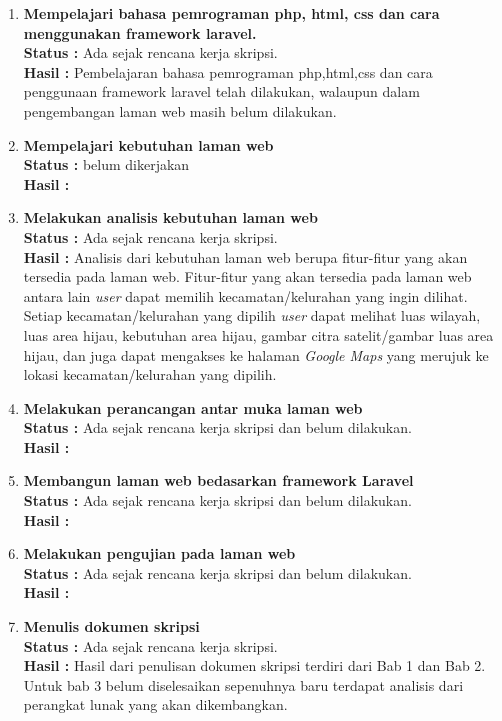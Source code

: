 \documentclass[a4paper,twoside]{article}
\begin{document}
\begin{enumerate}
		\item \textbf{Mempelajari bahasa pemrograman php, html, css dan cara menggunakan framework laravel.}\\
		{\bf Status :} Ada sejak rencana kerja skripsi.\\
		{\bf Hasil :} Pembelajaran bahasa pemrograman php,html,css dan cara penggunaan framework laravel telah dilakukan, walaupun dalam pengembangan laman web masih belum dilakukan.

		\item \textbf{ Mempelajari kebutuhan laman web}\\
		{\bf Status :} belum dikerjakan \\
		{\bf Hasil :} 

		\item \textbf{Melakukan analisis kebutuhan laman web} \\
		{\bf Status :} Ada sejak rencana kerja skripsi.\\
		{\bf Hasil :} Analisis dari kebutuhan laman web berupa fitur-fitur yang akan tersedia pada laman web. Fitur-fitur yang akan tersedia pada laman web antara lain \textit{user} dapat memilih kecamatan/kelurahan yang ingin dilihat. Setiap kecamatan/kelurahan yang dipilih \textit{user} dapat melihat luas wilayah, luas area hijau, kebutuhan area hijau, gambar citra satelit/gambar luas area hijau, dan juga dapat mengakses ke halaman \textit{Google Maps} yang merujuk ke lokasi kecamatan/kelurahan yang dipilih.

		\item \textbf{ Melakukan perancangan antar muka laman web}\\
		{\bf Status :} Ada sejak rencana kerja skripsi dan belum dilakukan.\\
		{\bf Hasil :}

		\item \textbf{Membangun laman web bedasarkan framework Laravel}\\
		{\bf Status :} Ada sejak rencana kerja skripsi dan belum dilakukan.\\
		{\bf Hasil :}
		
		\item \textbf{Melakukan pengujian pada laman web}\\
		{\bf Status :} Ada sejak rencana kerja skripsi dan belum dilakukan.\\
		{\bf Hasil :}
		
		\item \textbf{Menulis dokumen skripsi}\\
		{\bf Status :} Ada sejak rencana kerja skripsi.\\
		{\bf Hasil :} Hasil dari penulisan dokumen skripsi terdiri dari Bab 1 dan Bab 2. Untuk bab 3 belum diselesaikan sepenuhnya baru terdapat analisis dari perangkat lunak yang akan dikembangkan.


\end{enumerate}
\end{document}

